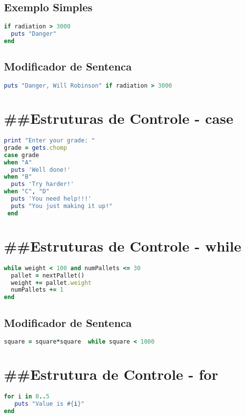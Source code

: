 \documentclass[serif,mathserif]{article}
\begin{document}
\subsection {Exemplo Simples}
\begin{lstlisting}[language=ruby]
if radiation > 3000
  puts "Danger"
end
\end{lstlisting}

\subsection {Modificador de Sentenca}
\begin{lstlisting}[language=ruby]
puts "Danger, Will Robinson" if radiation > 3000
\end{lstlisting}

\section{\#\#Estruturas de Controle - case} 
\begin{lstlisting}[language=ruby]
print "Enter your grade: "
grade = gets.chomp
case grade
when "A"
  puts 'Well done!'
when "B"
  puts 'Try harder!'
when "C", "D"
  puts 'You need help!!!'
  puts "You just making it up!"
 end
\end{lstlisting}


\section{\#\#Estruturas de Controle - while}
\begin{lstlisting}[language=ruby]
while weight < 100 and numPallets <= 30
  pallet = nextPallet()
  weight += pallet.weight
  numPallets += 1
end
\end{lstlisting}
 
\subsection {Modificador de Sentenca}
\begin{lstlisting}[language=ruby]
square = square*square  while square < 1000
\end{lstlisting}

\section{\#\#Estrutura de Controle -  for}
\begin{lstlisting}[language=ruby]
for i in 0..5
   puts "Value is #{i}"
end
\end{lstlisting}
\end{document}
